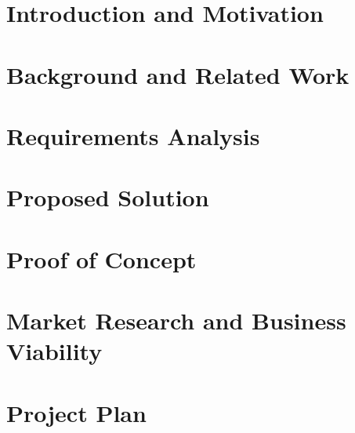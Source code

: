 \documentclass[12pt]{article}
\begin{document}
\begin{linenumbers}
\makeatletter
\patchcmd{\@startsection}{\@ifstar}{\nolinenumbers\@ifstar}{}{}
\patchcmd{\@xsect}{\ignorespaces}{\linenumbers\ignorespaces}{}{}
\makeatother

\section{Introduction and Motivation} \label{sec:intro}


\section{Background and Related Work} \label{sec:background}


\section{Requirements Analysis} \label{sec:requirements}


\section{Proposed Solution} \label{sec:solution}


\section{Proof of Concept} \label{sec:poc}


\section{Market Research and Business Viability} \label{sec:market}


\section{Project Plan} \label{sec:plan}


\end{linenumbers}

% 

\newpage

\printbibliography[heading=bibintoc]

\newpage

\begin{appendices}
    
\end{appendices}
\end{document}
